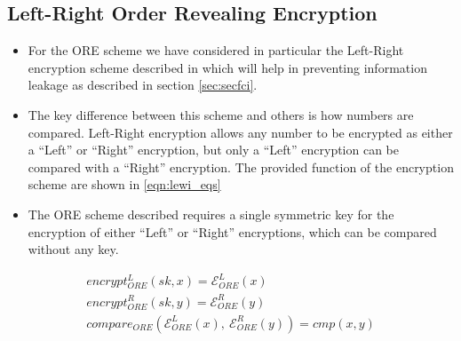 \documentclass[letterpaper, 10 pt, conference]{ieeeconf}  %
\begin{document}
\subsection{Left-Right Order Revealing Encryption}
\begin{itemize}
   \item For the ORE scheme we have considered in particular the Left-Right encryption scheme described in \cite{lewiOrderRevealingEncryptionNew2016} which will help in preventing information leakage as described in section \ref{sec:secfci}.
   \item The key difference between this scheme and others is how numbers are compared. Left-Right encryption allows any number to be encrypted as either a ``Left'' or ``Right'' encryption, but only a ``Left'' encryption can be compared with a ``Right'' encryption. The provided function of the encryption scheme are shown in \eqref{eqn:lewi_eqs}
   \item The ORE scheme described requires a single symmetric key for the encryption of either ``Left'' or ``Right'' encryptions, which can be compared without any key.
\end{itemize}
\begin{gather} \label{eqn:lewi_eqs}
   encrypt^L_{ORE}(sk, x) = \mathcal{E}^L_{ORE}(x) \\
   encrypt^R_{ORE}(sk, y) = \mathcal{E}^R_{ORE}(y) \\
   compare_{ORE}(\mathcal{E}^L_{ORE}(x),\ \mathcal{E}^R_{ORE}(y)) = cmp(x, y)
\end{gather}

\end{document}
